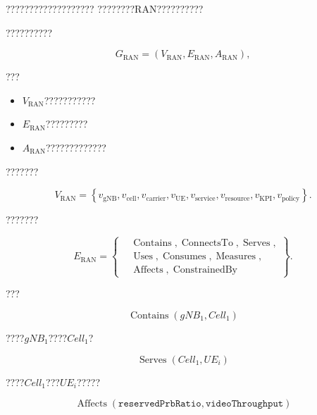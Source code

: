 ???????????????????
????????RAN??????????

??????????

\begin{equation}
G_{\mathrm{RAN}}
=
\left(
V_{\mathrm{RAN}},
E_{\mathrm{RAN}},
A_{\mathrm{RAN}}
\right),
\label{eq:ran_semantic_graph}
\end{equation}

???

\begin{itemize}
    \item $V_{\mathrm{RAN}}$???????????
    \item $E_{\mathrm{RAN}}$?????????
    \item $A_{\mathrm{RAN}}$?????????????
\end{itemize}

???????

\begin{equation}
V_{\mathrm{RAN}}
=
\left\{
v_{\mathrm{gNB}},
v_{\mathrm{cell}},
v_{\mathrm{carrier}},
v_{\mathrm{UE}},
v_{\mathrm{service}},
v_{\mathrm{resource}},
v_{\mathrm{KPI}},
v_{\mathrm{policy}}
\right\}.
\label{eq:ran_entity_types}
\end{equation}

???????

\begin{equation}
E_{\mathrm{RAN}}
=
\left\{
\begin{aligned}
&\operatorname{Contains},
\operatorname{ConnectsTo},
\operatorname{Serves},
\\
&\operatorname{Uses},
\operatorname{Consumes},
\operatorname{Measures},
\\
&\operatorname{Affects},
\operatorname{ConstrainedBy}
\end{aligned}
\right\}.
\label{eq:ran_relation_types}
\end{equation}

???

\begin{equation}
\operatorname{Contains}
\left(
gNB_1,
Cell_1
\right)
\end{equation}

????$gNB_1$????$Cell_1$?

\begin{equation}
\operatorname{Serves}
\left(
Cell_1,
UE_i
\right)
\end{equation}

????$Cell_1$???$UE_i$?????

\begin{equation}
\operatorname{Affects}
\left(
\texttt{reservedPrbRatio},
\texttt{videoThroughput}
\right)
\end{equation}

